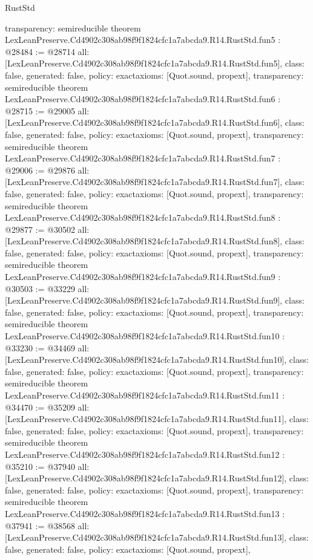 \begin{lexlean}{RustStd}
\begin{coremodule}
{  transparency: semireducible
}
theorem LexLeanPreserve.Cd4902c308ab98f9f1824cfc1a7abcda9.R14.RustStd.fun5 : @28484 := @28714 {
  all: [LexLeanPreserve.Cd4902c308ab98f9f1824cfc1a7abcda9.R14.RustStd.fun5],
  class: false,
  generated: false,
  policy: exact{axioms: [Quot.sound, propext]},
  transparency: semireducible
}
theorem LexLeanPreserve.Cd4902c308ab98f9f1824cfc1a7abcda9.R14.RustStd.fun6 : @28715 := @29005 {
  all: [LexLeanPreserve.Cd4902c308ab98f9f1824cfc1a7abcda9.R14.RustStd.fun6],
  class: false,
  generated: false,
  policy: exact{axioms: [Quot.sound, propext]},
  transparency: semireducible
}
theorem LexLeanPreserve.Cd4902c308ab98f9f1824cfc1a7abcda9.R14.RustStd.fun7 : @29006 := @29876 {
  all: [LexLeanPreserve.Cd4902c308ab98f9f1824cfc1a7abcda9.R14.RustStd.fun7],
  class: false,
  generated: false,
  policy: exact{axioms: [Quot.sound, propext]},
  transparency: semireducible
}
theorem LexLeanPreserve.Cd4902c308ab98f9f1824cfc1a7abcda9.R14.RustStd.fun8 : @29877 := @30502 {
  all: [LexLeanPreserve.Cd4902c308ab98f9f1824cfc1a7abcda9.R14.RustStd.fun8],
  class: false,
  generated: false,
  policy: exact{axioms: [Quot.sound, propext]},
  transparency: semireducible
}
theorem LexLeanPreserve.Cd4902c308ab98f9f1824cfc1a7abcda9.R14.RustStd.fun9 : @30503 := @33229 {
  all: [LexLeanPreserve.Cd4902c308ab98f9f1824cfc1a7abcda9.R14.RustStd.fun9],
  class: false,
  generated: false,
  policy: exact{axioms: [Quot.sound, propext]},
  transparency: semireducible
}
theorem LexLeanPreserve.Cd4902c308ab98f9f1824cfc1a7abcda9.R14.RustStd.fun10 : @33230 := @34469 {
  all: [LexLeanPreserve.Cd4902c308ab98f9f1824cfc1a7abcda9.R14.RustStd.fun10],
  class: false,
  generated: false,
  policy: exact{axioms: [Quot.sound, propext]},
  transparency: semireducible
}
theorem LexLeanPreserve.Cd4902c308ab98f9f1824cfc1a7abcda9.R14.RustStd.fun11 : @34470 := @35209 {
  all: [LexLeanPreserve.Cd4902c308ab98f9f1824cfc1a7abcda9.R14.RustStd.fun11],
  class: false,
  generated: false,
  policy: exact{axioms: [Quot.sound, propext]},
  transparency: semireducible
}
theorem LexLeanPreserve.Cd4902c308ab98f9f1824cfc1a7abcda9.R14.RustStd.fun12 : @35210 := @37940 {
  all: [LexLeanPreserve.Cd4902c308ab98f9f1824cfc1a7abcda9.R14.RustStd.fun12],
  class: false,
  generated: false,
  policy: exact{axioms: [Quot.sound, propext]},
  transparency: semireducible
}
theorem LexLeanPreserve.Cd4902c308ab98f9f1824cfc1a7abcda9.R14.RustStd.fun13 : @37941 := @38568 {
  all: [LexLeanPreserve.Cd4902c308ab98f9f1824cfc1a7abcda9.R14.RustStd.fun13],
  class: false,
  generated: false,
  policy: exact{axioms: [Quot.sound, propext]},
}
\end{coremodule}
\end{lexlean}
